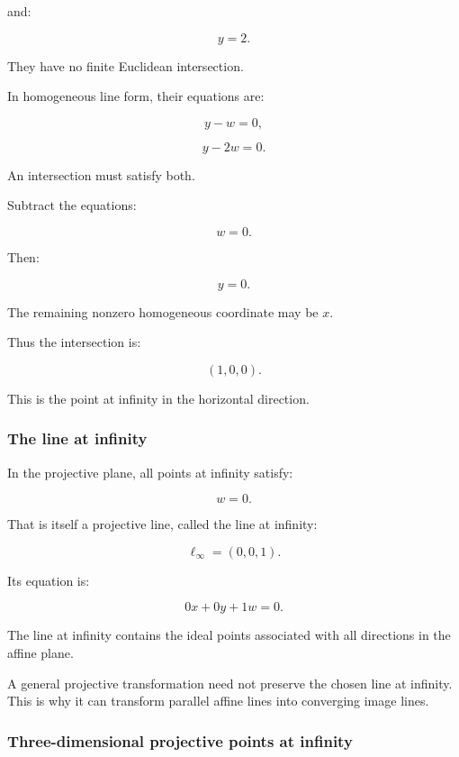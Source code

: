 and:

\[
 y=2.
\]

They have no finite Euclidean intersection.

In homogeneous line form, their equations are:

\[
 y-w=0,
\]

\[
 y-2w=0.
\]

An intersection must satisfy both.

Subtract the equations:

\[
 w=0.
\]

Then:

\[
 y=0.
\]

The remaining nonzero homogeneous coordinate may be \(x\).

Thus the intersection is:

\[
 \boxed{ (1,0,0) }.
\]

This is the point at infinity in the horizontal direction.

\subsubsection{The line at infinity}\label{02-foundations-ii-ch032-the-line-at-infinity}

\hypertarget{02-foundations-ii-ch032-the-line-at-infinity}{}

In the projective plane, all points at infinity satisfy:

\[
 w=0.
\]

That is itself a projective line, called the line at infinity:

\[
 \boxed{ \ell_\infty=(0,0,1) }.
\]

Its equation is:

\[
 0x+0y+1w=0.
\]

The line at infinity contains the ideal points associated with all directions in the affine plane.

A general projective transformation need not preserve the chosen line at infinity. This is why it can transform parallel affine lines into converging image lines.

\subsubsection{Three-dimensional projective points at infinity}\label{02-foundations-ii-ch032-three-dimensional-projective-points-at-infinity}

\hypertarget{02-foundations-ii-ch032-three-dimensional-projective-points-at-infinity}{}

